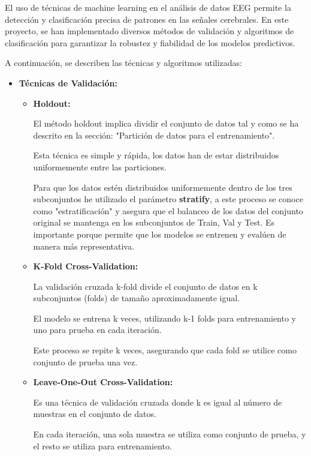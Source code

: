 El uso de técnicas de machine learning en el análisis de datos EEG permite la detección y clasificación precisa de patrones en las señales cerebrales. En este proyecto, se han implementado diversos métodos de validación y algoritmos de clasificación para garantizar la robustez y fiabilidad de los modelos predictivos. 

A continuación, se describen las técnicas y algoritmos utilizadas:


\begin{itemize}

\item
\textbf{Técnicas de Validación:}

	\begin{itemize}
	
	\item
	\textbf{Holdout:}
	
	El método holdout implica dividir el conjunto de datos tal y como se ha descrito en la sección: "Partición de datos para el entrenamiento".
	
	
	Esta técnica es simple y rápida, los datos han de estar distribuidos uniformemente entre las particiones.
	
	Para que los datos estén distribuidos uniformemente dentro de los tres subconjuntos he utilizado el parámetro \textbf{stratify}, a este proceso se conoce como "estratificación" y asegura que el balanceo de los datos del conjunto original se mantenga en los subconjuntos de Train, Val y Test. Es importante porque permite que los modelos se entrenen y evalúen de manera más representativa.
	
	

	\item
	\textbf{K-Fold Cross-Validation:}
	
	
	La validación cruzada k-fold divide el conjunto de datos en k subconjuntos (folds) de tamaño aproximadamente igual.
	
	El modelo se entrena k veces, utilizando k-1 folds para entrenamiento y uno para prueba en cada iteración.
	
	Este proceso se repite k veces, asegurando que cada fold se utilice como conjunto de prueba una vez.
	
	\item
	\textbf{Leave-One-Out Cross-Validation:}
	
	Es una técnica de validación cruzada donde k es igual al número de muestras en el conjunto de datos.
	
	En cada iteración, una sola muestra se utiliza como conjunto de prueba, y el resto se utiliza para entrenamiento.
	

\end{itemize}
\end{itemize}
